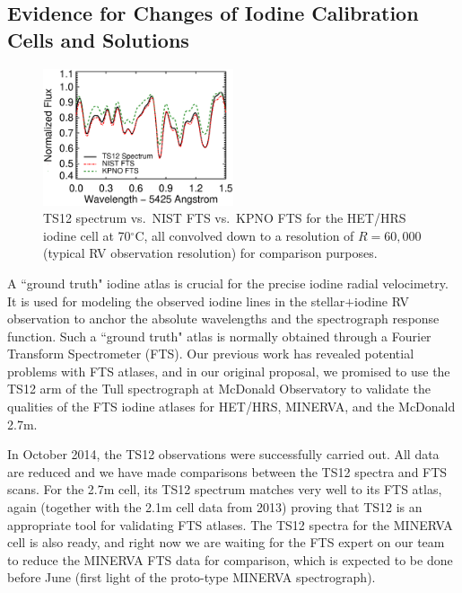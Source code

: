 \documentclass[12pt]{article}
\def\degree{^{\circ}}
\begin{document}
\subsection{Evidence for Changes of Iodine Calibration Cells and Solutions}\label{sec:fts}
\vspace{-5pt}


\begin{figure}
  \vspace{-35pt}
  \begin{center}
    \includegraphics[width=0.5\textwidth]{het70_comp}
  \end{center}
  \vspace{-25pt}  
  \caption{TS12 spectrum vs.\ NIST FTS vs.\ KPNO FTS for the HET/HRS
    iodine cell at 70$\degree$C, all convolved down to a resolution of
    $R=60,000$ (typical RV observation resolution) for comparison
    purposes.}
  \vspace{-8pt}  
  \label{fig:fts}
\end{figure}


A ``ground truth" iodine atlas is crucial for the precise iodine
radial velocimetry. It is used for modeling the observed iodine lines
in the stellar$+$iodine RV observation to anchor the absolute
wavelengths and the spectrograph response function. Such a ``ground
truth" atlas is normally obtained through a Fourier Transform
Spectrometer (FTS). Our previous work has revealed potential problems
with FTS atlases, and in our original proposal, we promised to use the
TS12 arm of the Tull spectrograph at McDonald Observatory to validate
the qualities of the FTS iodine atlases for HET/HRS, MINERVA, and the
McDonald 2.7m.

In October 2014, the TS12 observations were successfully carried
out. All data are reduced and we have made comparisons between the
TS12 spectra and FTS scans. For the 2.7m cell, its TS12 spectrum
matches very well to its FTS atlas, again (together with the 2.1m cell
data from 2013) proving that TS12 is an appropriate tool for
validating FTS atlases. The TS12 spectra for the MINERVA cell is also
ready, and right now we are waiting for the FTS expert on our team to
reduce the MINERVA FTS data for comparison, which is expected to be
done before June (first light of the proto-type MINERVA spectrograph).
\end{document}
